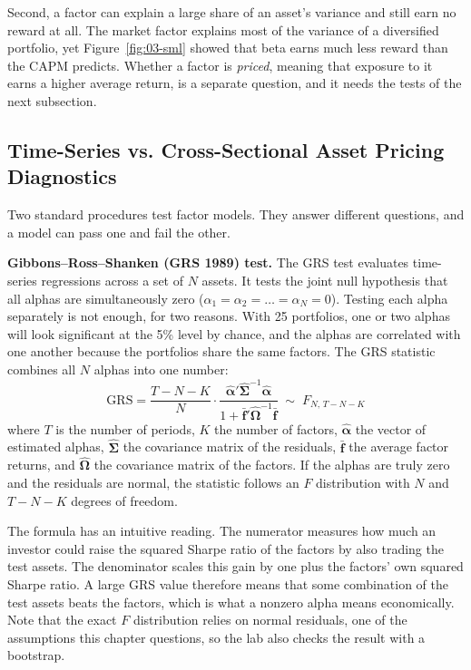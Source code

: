 Second, a factor can explain a large share of an asset's variance and still earn no reward at all. The market factor explains most of the variance of a diversified portfolio, yet Figure~\ref{fig:03-sml} showed that beta earns much less reward than the CAPM predicts. Whether a factor is \emph{priced}, meaning that exposure to it earns a higher average return, is a separate question, and it needs the tests of the next subsection.

\subsection{Time-Series vs. Cross-Sectional Asset Pricing Diagnostics}
Two standard procedures test factor models. They answer different questions, and a model can pass one and fail the other.

\textbf{Gibbons--Ross--Shanken (GRS 1989) test.} The GRS test evaluates time-series regressions across a set of $N$ assets. It tests the joint null hypothesis that all alphas are simultaneously zero ($\alpha_1 = \alpha_2 = \dots = \alpha_N = 0$). Testing each alpha separately is not enough, for two reasons. With 25 portfolios, one or two alphas will look significant at the 5\% level by chance, and the alphas are correlated with one another because the portfolios share the same factors. The GRS statistic combines all $N$ alphas into one number:
\begin{equation}
  \mathrm{GRS} = \frac{T-N-K}{N} \cdot \frac{\hat{\boldsymbol{\alpha}}' \hat{\boldsymbol{\Sigma}}^{-1} \hat{\boldsymbol{\alpha}}}{1 + \bar{\mathbf{f}}' \hat{\boldsymbol{\Omega}}^{-1} \bar{\mathbf{f}}} \;\sim\; F_{N,\,T-N-K}
  \label{eq:03-grs}
\end{equation}
where $T$ is the number of periods, $K$ the number of factors, $\hat{\boldsymbol{\alpha}}$ the vector of estimated alphas, $\hat{\boldsymbol{\Sigma}}$ the covariance matrix of the residuals, $\bar{\mathbf{f}}$ the average factor returns, and $\hat{\boldsymbol{\Omega}}$ the covariance matrix of the factors. If the alphas are truly zero and the residuals are normal, the statistic follows an $F$ distribution with $N$ and $T-N-K$ degrees of freedom.

The formula has an intuitive reading. The numerator measures how much an investor could raise the squared Sharpe ratio of the factors by also trading the test assets. The denominator scales this gain by one plus the factors' own squared Sharpe ratio. A large GRS value therefore means that some combination of the test assets beats the factors, which is what a nonzero alpha means economically. Note that the exact $F$ distribution relies on normal residuals, one of the assumptions this chapter questions, so the lab also checks the result with a bootstrap.

